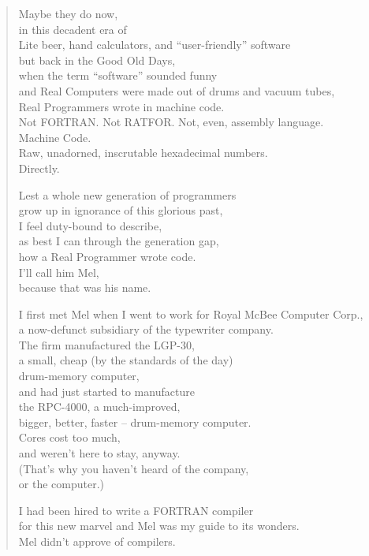 \documentclass[10pt,twoside,openright]{memoir}
\begin{document}
{\small
{}
\begin{verse}
Maybe they do now, \\
in this decadent era of \\
Lite beer, hand calculators, and ``user-friendly'' software \\
but back in the Good Old Days, \\
when the term ``software'' sounded funny \\
and Real Computers were made out of drums and vacuum tubes, \\
Real Programmers wrote in machine code. \\
Not FORTRAN.  Not RATFOR.  Not, even, assembly language. \\
Machine Code. \\
Raw, unadorned, inscrutable hexadecimal numbers. \\
Directly.

Lest a whole new generation of programmers \\
grow up in ignorance of this glorious past, \\
I feel duty-bound to describe, \\
as best I can through the generation gap, \\
how a Real Programmer wrote code. \\
I'll call him Mel, \\
because that was his name.

I first met Mel when I went to work for Royal McBee Computer Corp., \\
a now-defunct subsidiary of the typewriter company. \\
The firm manufactured the LGP-30, \\
a small, cheap (by the standards of the day) \\
drum-memory computer, \\
and had just started to manufacture \\
the RPC-4000, a much-improved, \\
bigger, better, faster -- drum-memory computer. \\
Cores cost too much, \\
and weren't here to stay, anyway. \\
(That's why you haven't heard of the company, \\
or the computer.)

I had been hired to write a FORTRAN compiler \\
for this new marvel and Mel was my guide to its wonders. \\
Mel didn't approve of compilers.


\end{verse}}
\end{document}
